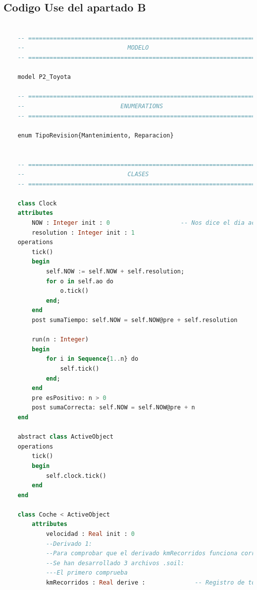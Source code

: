 \documentclass[12pt.a4paper]{article}
\begin{document}
\subsection{Codigo Use del apartado B}
\begin{lstlisting}[style = useNormal,language=SQL, caption={Codigo Use del apartado B}] 

    -- =====================================================================
    --                             MODELO
    -- =====================================================================
    
    model P2_Toyota
    
    -- =====================================================================
    --                           ENUMERATIONS
    -- =====================================================================
    
    enum TipoRevision{Mantenimiento, Reparacion}
    
    
    -- =====================================================================
    --                             CLASES
    -- =====================================================================
    
    class Clock
    attributes
        NOW : Integer init : 0                    -- Nos dice el dia actual en el que se encuentra el sistema
        resolution : Integer init : 1
    operations
        tick()
        begin
            self.NOW := self.NOW + self.resolution;
            for o in self.ao do
                o.tick()
            end;
        end
        post sumaTiempo: self.NOW = self.NOW@pre + self.resolution
    
        run(n : Integer)
        begin
            for i in Sequence{1..n} do
                self.tick()
            end;
        end
        pre esPositivo: n > 0
        post sumaCorrecta: self.NOW = self.NOW@pre + n
    end
    
    abstract class ActiveObject
    operations
        tick()
        begin
            self.clock.tick()
        end
    end
    
    class Coche < ActiveObject
        attributes
            velocidad : Real init : 0
            --Derivado 1:
            --Para comprobar que el derivado kmRecorridos funciona correctamente:
            --Se han desarrollado 3 archivos .soil:
            ---El primero comprueba 
            kmRecorridos : Real derive :              -- Registro de todos los km que ha recorrido el coche entre ciudades en sus viajes
            

\end{lstlisting}
\end{document}

